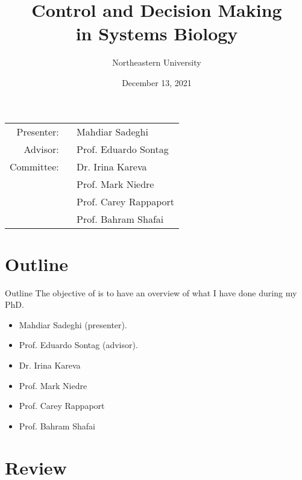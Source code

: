 \documentclass[10pt]{beamer}
\title[Proposal Review]{Control and Decision Making \\ in Systems Biology}
\author{Northeastern University}
\date{December 13, 2021}
\begin{document}
\begin{frame}
	\maketitle
	\small \hspace{3cm}
	{\begin{tabular}{r@{}l}
			Presenter: \ & Mahdiar Sadeghi \\
			Advisor:   \  & Prof. Eduardo Sontag \\
			Committee: \  & Dr. Irina Kareva \\
			& Prof. Mark Niedre \\
			& Prof. Carey Rappaport \\
			& Prof. Bahram Shafai
		\end{tabular}
	}
\end{frame}

\section{Outline}

\begin{frame}{Outline}
	The objective of is to have an overview of what I have done during my PhD. 
	\vspace{15pt}
    \begin{itemize}
        \setlength\itemsep{1em}
        \item Mahdiar Sadeghi (presenter).
        
        \item Prof. Eduardo Sontag (advisor).
        \item Dr. Irina Kareva
        \item Prof. Mark Niedre
        \item Prof. Carey Rappaport
        \item Prof. Bahram Shafai
    \end{itemize}
\end{frame}

\section{Review}
\end{document}
